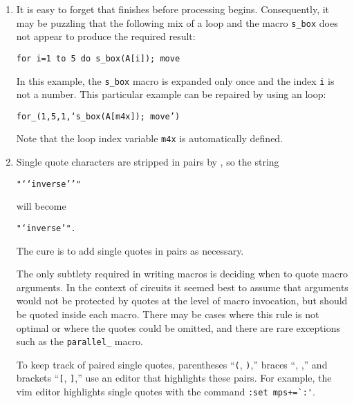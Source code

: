 \begin{enumerate}
{\tt source(0.5)}

\noindent draws a source of length 0.5 units
in the current \pic default direction, which is one of
{\tt right,} {\tt left,} {\tt up,} or {\tt down.}
The best practice is
to specify both the direction and length of an element, thus:

{\tt source(up\_ elen\_).}

The effect of a \linespec argument is independent of any direction
set using the {\tt Point\_} or similar macros. 
To draw an element at an obtuse angle (see ) try,
for example,

{\tt Point\_(45); source(to rvec\_(0.5,0))}

\item 
{}
It is easy to forget that \Mfour finishes before \pic processing
begins. Consequently, it may be puzzling that the following mix of
a \pic loop and the \Mfour macro {\tt s\_box} does not appear to produce
the required result:

{\tt for i=1 to 5 do \lbr s\_box(A[i]); move \rbr}

\noindent In this example, the {\tt s\_box} macro is expanded only once
and the index {\tt i} is not a number.  This particular example can be
repaired by using an \Mfour loop:

{\tt for\_(1,5,1,`s\_box(A[m4x]); move')}

Note that the loop index variable {\tt m4x} is automatically defined.

\item 
{}
 Single quote characters are stripped in pairs by \Mfour, so the string

{\tt "{`}{`}inverse{'}{'}"}

\noindent will become

{\tt "{`}inverse{'}".}

\noindent The cure is to add single quotes in pairs as necessary.

  The only subtlety required in writing
  \Mfour macros is deciding when to quote macro arguments.  In the context
  of circuits it seemed best to assume that arguments would not
  be protected by quotes at the level of macro invocation, but should
  be quoted inside each macro.  There may be cases where this rule is
  not optimal or where the quotes could be omitted, and there are
  rare exceptions such as the {\tt parallel\_} macro.

  To keep track of paired single quotes, parentheses ``{\tt (}, {\tt)},''
  braces ``\lbr, \rbr,'' and brackets ``{\tt [}, {\tt ]},'' use an editor
  that highlights these pairs.  For example, the vim editor highlights
  single quotes with the command \verb|:set mps+=`:'|.


\end{enumerate}
